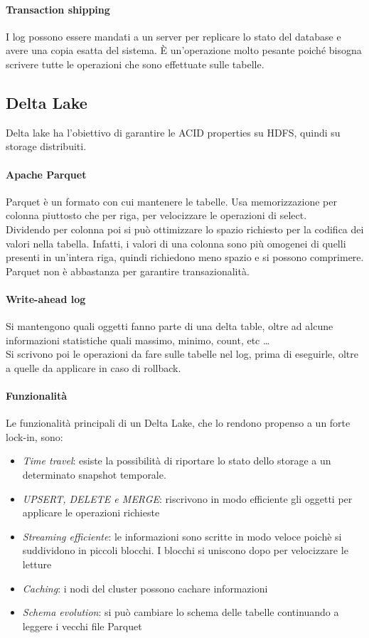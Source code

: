\paragraph{Transaction shipping}
I log possono essere mandati a un server per replicare lo stato del database e avere
una copia esatta del sistema. È un'operazione molto pesante poiché bisogna scrivere
tutte le operazioni che sono effettuate sulle tabelle.

\subsection{Delta Lake}
Delta lake ha l'obiettivo di garantire le ACID properties su HDFS, quindi su 
storage distribuiti.

\paragraph{Apache Parquet}
Parquet è un formato con cui mantenere le tabelle. Usa memorizzazione 
per colonna piuttosto che per riga, per velocizzare le operazioni di select.\\
Dividendo per colonna poi si può ottimizzare lo spazio richiesto per la codifica
dei valori nella tabella. Infatti, i valori di una colonna sono più omogenei
di quelli presenti in un'intera riga, quindi richiedono meno spazio e si possono
comprimere. Parquet non è abbastanza per garantire transazionalità.

\paragraph{Write-ahead log} 
Si mantengono quali oggetti fanno parte di una delta table, oltre ad 
alcune informazioni statistiche quali massimo, minimo, count, etc \dots\\
Si scrivono poi le operazioni da fare sulle tabelle nel log, prima di eseguirle, 
oltre a quelle da applicare in caso di rollback.

\paragraph{Funzionalità}
Le funzionalità principali di un Delta Lake, che lo rendono propenso a un forte lock-in, sono:
\begin{itemize}
    \item \emph{Time travel}: esiste la possibilità di riportare lo stato dello storage a un determinato
    snapshot temporale.
    \item \emph{UPSERT, DELETE e MERGE}: riscrivono in modo efficiente gli oggetti per 
    applicare le operazioni richieste
    \item \emph{Streaming efficiente}: le informazioni sono scritte in modo veloce poichè 
    si suddividono in piccoli blocchi. I blocchi si uniscono dopo per velocizzare le letture
    \item \emph{Caching}: i nodi del cluster possono cachare informazioni
    \item \emph{Schema evolution}: si può cambiare lo schema delle tabelle continuando 
    a leggere i vecchi file Parquet 
\end{itemize}

